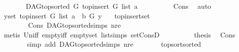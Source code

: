 \begin{isabellebody}
\ \ \ \ \isamarkupfalse%
\ \isamarkupfalse%
\ {\isachardoublequoteopen}DAG{\isachardot}{\kern0pt}top{\isacharunderscore}{\kern0pt}sorted\ G\ {\isacharparenleft}{\kern0pt}top{\isacharunderscore}{\kern0pt}insert\ G\ list\ a{\isacharparenright}{\kern0pt}{\isachardoublequoteclose}\ \isanewline
\ \ \ \ \ \ \isamarkupfalse%
\ \ Cons{\isacharparenleft}{\kern0pt}{}{\isacharcomma}{\kern0pt}{}{\isacharparenright}{\kern0pt}\ \isamarkupfalse%
\ auto\isanewline
\ \ \ \ \isamarkupfalse%
\ \isamarkupfalse%
\ {\isachardoublequoteopen}{\isacharparenleft}{\kern0pt}{\isasymforall}y{\isasymin}set\ {\isacharparenleft}{\kern0pt}top{\isacharunderscore}{\kern0pt}insert\ G\ list\ a{\isacharparenright}{\kern0pt}{\isachardot}{\kern0pt}\ {\isasymnot}\ b\ {\isasymrightarrow}\isactrlsup {\isacharplus}{\kern0pt}\isactrlbsub G\isactrlesub \ y\ {\isacharparenright}{\kern0pt}{\isachardoublequoteclose}\ \isamarkupfalse%
\ top{\isacharunderscore}{\kern0pt}insert{\isacharunderscore}{\kern0pt}set\ \isanewline
\ \ \ \ \ \ \ \ Cons\ DAG{\isachardot}{\kern0pt}top{\isacharunderscore}{\kern0pt}sorted{\isachardot}{\kern0pt}simps{\isacharparenleft}{\kern0pt}{}{\isacharparenright}{\kern0pt}\ nre\isanewline
\ \ \ \ \ \ \isamarkupfalse%
\ {\isacharparenleft}{\kern0pt}metis\ Un{\isacharunderscore}{\kern0pt}iff\ empty{\isacharunderscore}{\kern0pt}iff\ empty{\isacharunderscore}{\kern0pt}set\ list{\isachardot}{\kern0pt}simps{\isacharparenleft}{\kern0pt}{}{}{\isacharparenright}{\kern0pt}\ set{\isacharunderscore}{\kern0pt}ConsD{\isacharparenright}{\kern0pt}\ \ \isanewline
\ \ \ \ \isamarkupfalse%
\ \isamarkupfalse%
\ {\isacharquery}{\kern0pt}thesis\ \isamarkupfalse%
\ Cons{\isacharparenleft}{\kern0pt}{}{\isacharparenright}{\kern0pt}\isanewline
\ \ \ \ \ \ \isamarkupfalse%
\ {\isacharparenleft}{\kern0pt}simp\ add{\isacharcolon}{\kern0pt}\ DAG{\isachardot}{\kern0pt}top{\isacharunderscore}{\kern0pt}sorted{\isachardot}{\kern0pt}simps{\isacharparenleft}{\kern0pt}{}{\isacharparenright}{\kern0pt}\ nre{\isacharparenright}{\kern0pt}\ \ \isanewline
\ \ \isamarkupfalse%
\ \isanewline
{}\isamarkupfalse%
%
\endisatagproof
{\isafoldproof}%
%
\isadelimproof
\isanewline
%
\endisadelimproof
\isanewline
\isanewline
{}\isamarkupfalse%
\ top{\isacharunderscore}{\kern0pt}sort{\isacharunderscore}{\kern0pt}sorted{\isacharcolon}{\kern0pt}\isanewline

\end{isabellebody}
